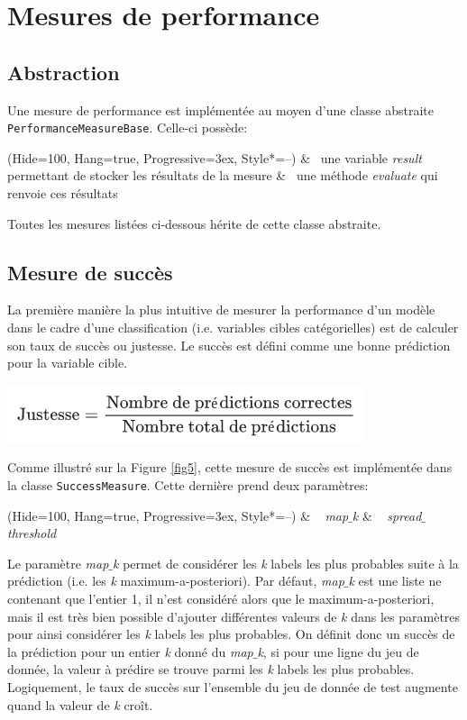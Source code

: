 \section{Mesures de performance}

\subsection{Abstraction}

Une mesure de performance est implémentée au moyen d’une classe abstraite \texttt{PerformanceMeasureBase}. Celle-ci possède:
\begin{easylist}
\ListProperties(Hide=100, Hang=true, Progressive=3ex, Style*=--)
& ~une variable \textit{result} permettant de stocker les résultats de la mesure
& ~une méthode \textit{evaluate} qui renvoie ces résultats
\end{easylist}

Toutes les mesures listées ci-dessous hérite de cette classe abstraite.  

\subsection{Mesure de succès}

La première manière la plus intuitive de mesurer la performance d’un modèle dans le cadre d’une classification (i.e. variables cibles catégorielles) est de calculer son taux de succès ou justesse. Le succès est défini comme une bonne prédiction pour la variable cible.

\begin{center}
\includegraphics[scale=0.6]{figures/justesse.png}
\end{center}

Comme illustré sur la Figure \ref{fig5}, cette mesure de succès est implémentée  dans la classe \texttt{SuccessMeasure}. Cette dernière prend deux paramètres:
\begin{easylist}
\ListProperties(Hide=100, Hang=true, Progressive=3ex, Style*=--)
& ~ \textit{map$\_$k}
& ~ \textit{spread$\_$threshold}
\end{easylist}

Le paramètre \textit{map$\_$k} permet de considérer les \textit{k} labels les plus probables suite à la prédiction (i.e. les \textit{k} maximum-a-posteriori). Par défaut, \textit{map$\_$k} est une liste ne contenant que l’entier 1, il n’est considéré alors que le maximum-a-posteriori, mais il est très bien possible d'ajouter différentes valeurs de \textit{k} dans les paramètres pour ainsi considérer les \textit{k} labels les plus probables. On définit donc un succès de la prédiction pour un entier \textit{k} donné du \textit{map$\_$k}, si pour une ligne du jeu de donnée, la valeur à prédire se trouve parmi les \textit{k} labels les plus probables. Logiquement, le taux de succès sur l’ensemble du jeu de donnée de test augmente quand la valeur de \textit{k} croît.

